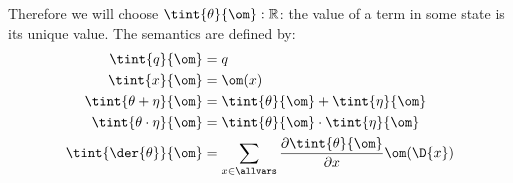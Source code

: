 Therefore we will choose $\tint{\theta}{\om} : \mathbb{R}$: the value of a term in some state is its unique value.
The semantics are defined by:
\begin{align*}
  \tint{q}{\om} &= q\\
  \tint{x}{\om} &= \om(x)\\
  \tint{\theta + \eta}{\om} &= \tint{\theta}{\om} + \tint{\eta}{\om}\\
  \tint{\theta \cdot \eta}{\om} &= \tint{\theta}{\om} \cdot \tint{\eta}{\om}\\
  \tint{\der{\theta}}{\om} &= \sum_{x\in\allvars}\frac{\partial\tint{\theta}{\om}}{\partial x}\om(\D{x})
\end{align*}

